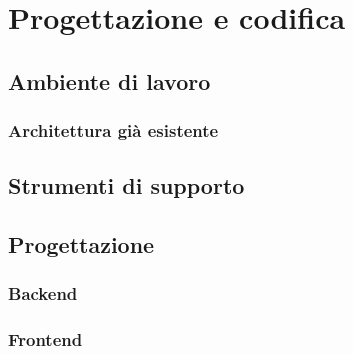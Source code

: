 \chapter{Progettazione e codifica}
\label{chap:progettazione}

\section{Ambiente di lavoro}
\subsection{Architettura già esistente}

\section{Strumenti di supporto}

\section{Progettazione}

\subsection{Backend}
\subsection{Frontend}